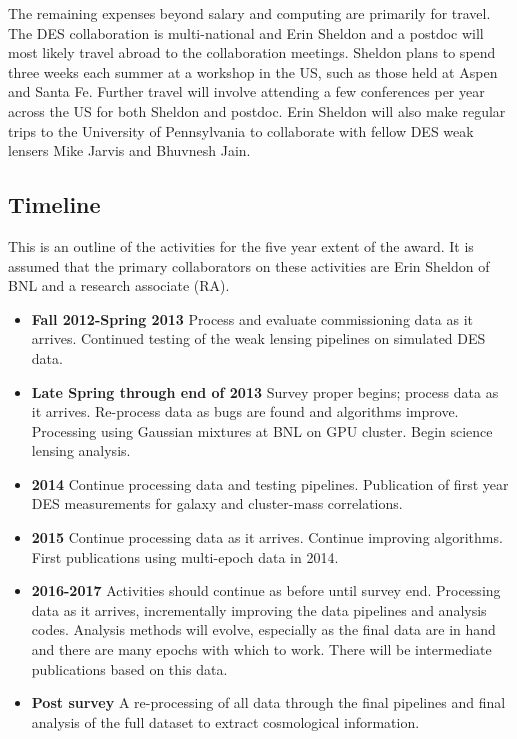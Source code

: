 \documentclass[12pt]{article}
\begin{document}
The remaining expenses beyond salary and computing are primarily for travel.
The DES collaboration is multi-national and Erin Sheldon and a postdoc will
most likely travel abroad to the collaboration meetings.  Sheldon plans to
spend three weeks each summer at a workshop in the US, such as those held at
Aspen and Santa Fe.  Further travel will involve attending a few conferences
per year across the US for both Sheldon and postdoc.  Erin Sheldon will also
make regular trips to the University of Pennsylvania to collaborate with fellow
DES weak lensers Mike Jarvis and Bhuvnesh Jain.

\clearpage
\newpage
\subsection{Timeline} \label{sec:timeline}

This is an outline of the activities for the five year extent of the award.  It
is assumed that the primary collaborators on these activities are Erin Sheldon
of BNL and a research associate (RA).

\begin{itemize}

\item {\bf Fall 2012-Spring 2013} Process and evaluate commissioning data as it
arrives.  Continued testing of the weak lensing pipelines on simulated
DES data.

\item {\bf Late Spring through end of 2013} Survey proper begins; process data
as it arrives.  Re-process data as bugs are found and algorithms improve.
Processing using Gaussian mixtures at BNL on GPU cluster.  Begin science
lensing analysis.

\item {\bf 2014} Continue processing data and testing pipelines.  Publication
of first year DES measurements for galaxy and cluster-mass correlations.

\item {\bf 2015} Continue processing data as it arrives.  Continue
improving algorithms.   First publications using multi-epoch data
in 2014.

\item {\bf 2016-2017}  Activities should continue as before until survey end.
Processing data as it arrives, incrementally improving the data pipelines and
analysis codes.  Analysis methods will evolve, especially as the final data are
in hand and there are many epochs with which to work.   There will be
intermediate publications based on this data.

\item {\bf Post survey} A re-processing of all data through the final pipelines
and final analysis of the full dataset to extract cosmological information.


\end{itemize}
\end{document}
